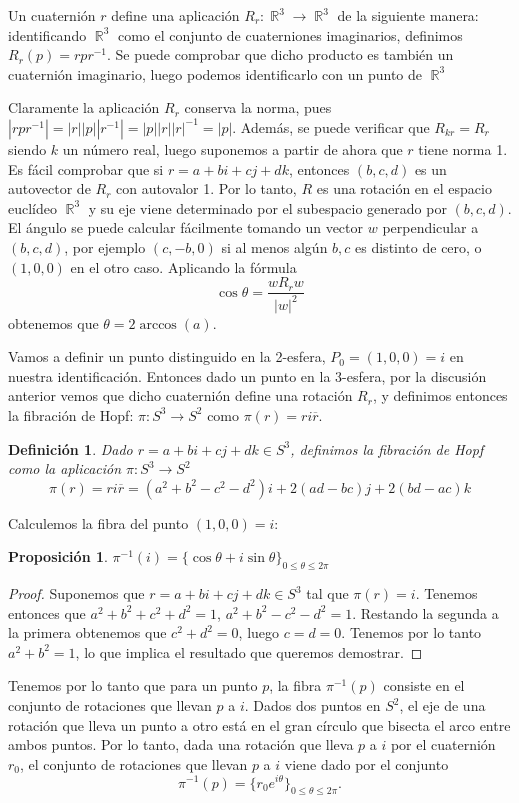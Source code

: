 \documentclass[11pt]{diazessay} %
\newtheorem{definition}{Definición}
\newtheorem{proposition}{Proposición}
\DeclareMathOperator{\R}{\mathbb{R}}
\begin{document}
Un cuaternión $r$ define una aplicación $R_r:\R^3\to\R^3$ de la siguiente manera: identificando $\R^3$ como el conjunto de cuaterniones imaginarios, definimos $R_r(p) = rpr^{-1}$. Se puede comprobar que dicho producto es también un cuaternión imaginario, luego podemos identificarlo con un punto de $\R^3$

Claramente la aplicación $R_r$ conserva la norma, pues $|rpr^{-1}|=|r||p||r^{-1}|=|p||r||r|^{-1}=|p|$. Además, se puede verificar que $R_{kr} = R_r$ siendo $k$ un número real, luego suponemos a partir de ahora que $r$ tiene norma 1. Es fácil comprobar que si $r=a+bi+cj+dk$, entonces $(b,c,d)$ es un autovector de $R_r$ con autovalor 1. Por lo tanto, $R$ es una rotación en el espacio euclídeo $\R^3$ y su eje viene determinado por el subespacio generado por $(b,c,d)$. El ángulo se puede calcular fácilmente tomando un vector $w$ perpendicular a $(b,c,d)$, por ejemplo $(c,-b,0)$ si al menos algún $b,c$ es distinto de cero, o $(1,0,0)$ en el otro caso. Aplicando la fórmula
\[\cos\theta = \frac{wR_rw}{|w|^2}\]
obtenemos que $\theta = 2\arccos(a)$.

Vamos a definir un punto distinguido en la 2-esfera, $P_0=(1,0,0)=i$ en nuestra identificación. Entonces dado un punto en la 3-esfera, por la discusión anterior vemos que dicho cuaternión define una rotación $R_r$, y definimos entonces la fibración de Hopf: $\pi:S^3\to S^2$ como $\pi(r)=ri\overline{r}$.

\begin{definition}
    Dado $r=a+bi+cj+dk\in S^3$, definimos la fibración de Hopf como la aplicación $\pi:S^3\to S^2$
    \[\pi(r)=ri\overline{r}=(a^2+b^2-c^2-d^2)i+2(ad-bc)j+2(bd-ac)k\]
\end{definition}

Calculemos la fibra del punto $(1,0,0)=i$:

\begin{proposition}
    $\pi^{-1}(i)=\{\cos\theta+i\sin\theta\}_{0\leq\theta\leq 2\pi}$
\end{proposition}
\begin{proof}
    Suponemos que $r=a+bi+cj+dk\in S^3$ tal que $\pi(r)=i$. Tenemos entonces que $a^2+b^2+c^2+d^2=1$, $a^2+b^2-c^2-d^2=1$. Restando la segunda a la primera obtenemos que $c^2+d^2=0$, luego $c=d=0$. Tenemos por lo tanto $a^2+b^2=1$, lo que implica el resultado que queremos demostrar.
\end{proof}

Tenemos por lo tanto que para un punto $p$, la fibra $\pi^{-1}(p)$ consiste en el conjunto de rotaciones que llevan $p$ a $i$. Dados dos puntos en $S^2$, el eje de una rotación que lleva un punto a otro está en el gran círculo que bisecta el arco entre ambos puntos. Por lo tanto, dada una rotación que lleva $p$ a $i$ por el cuaternión $r_0$, el conjunto de rotaciones que llevan $p$ a $i$ viene dado por el conjunto
\[\pi^{-1}(p) = \{r_0e^{i\theta}\}_{0\leq\theta\leq 2\pi}.\]
\end{document}
